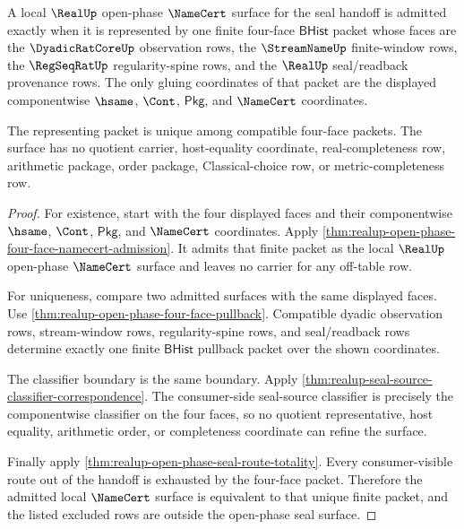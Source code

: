 \begin{theorem}
\label{thm:realup-open-phase-namecert-surface-completeness}
A local $\RealUp$ open-phase $\NameCert$ surface for the seal handoff is
admitted exactly when it is represented by one finite four-face
$\mathsf{BHist}$ packet whose faces are the $\DyadicRatCoreUp$ observation
rows, the $\StreamNameUp$ finite-window rows, the $\RegSeqRatUp$
regularity-spine rows, and the $\RealUp$ seal/readback provenance rows. The
only gluing coordinates of that packet are the displayed componentwise
$\hsame$, $\Cont$, $\mathsf{Pkg}$, and $\NameCert$ coordinates.

The representing packet is unique among compatible four-face packets. The
surface has no quotient carrier, host-equality coordinate, real-completeness
row, arithmetic package, order package, Classical-choice row, or
metric-completeness row.
\end{theorem}
\begin{proof}
For existence, start with the four displayed faces and their componentwise
$\hsame$, $\Cont$, $\mathsf{Pkg}$, and $\NameCert$ coordinates. Apply
\autoref{thm:realup-open-phase-four-face-namecert-admission}. It admits that
finite packet as the local $\RealUp$ open-phase $\NameCert$ surface and leaves
no carrier for any off-table row.

For uniqueness, compare two admitted surfaces with the same displayed faces.
Use \autoref{thm:realup-open-phase-four-face-pullback}. Compatible dyadic
observation rows, stream-window rows, regularity-spine rows, and seal/readback
rows determine exactly one finite $\mathsf{BHist}$ pullback packet over the
shown coordinates.

The classifier boundary is the same boundary. Apply
\autoref{thm:realup-seal-source-classifier-correspondence}. The consumer-side
seal-source classifier is precisely the componentwise classifier on the four
faces, so no quotient representative, host equality, arithmetic order, or
completeness coordinate can refine the surface.

Finally apply \autoref{thm:realup-open-phase-seal-route-totality}. Every
consumer-visible route out of the handoff is exhausted by the four-face
packet. Therefore the admitted local $\NameCert$ surface is equivalent to that
unique finite packet, and the listed excluded rows are outside the open-phase
seal surface.
\end{proof}

